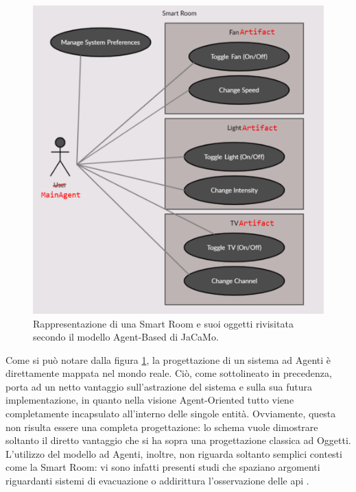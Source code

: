 \documentclass[12pt,a4paper,openright,oneside]{report}
\begin{document}
\begin{figure}[h]
	\centering
	\includegraphics[scale=0.45]{eps/use-case-high-agent.pdf}
	\caption{Rappresentazione di una Smart Room e suoi oggetti rivisitata secondo il modello Agent-Based di JaCaMo.}
	\label{fig:use-case-diagram-high-agent}
\end{figure}

Come si può notare dalla figura \ref{fig:use-case-diagram-high-agent}, la progettazione di un sistema ad Agenti è direttamente mappata nel mondo reale. Ciò, come sottolineato in precedenza, porta ad un netto vantaggio sull'astrazione del sistema e sulla sua futura implementazione, in quanto nella visione Agent-Oriented tutto viene completamente incapsulato all'interno delle singole entità. Ovviamente, questa non risulta essere una completa progettazione: lo schema vuole dimostrare soltanto il diretto vantaggio che si ha sopra una progettazione classica ad Oggetti.\\

L'utilizzo del modello ad Agenti, inoltre, non riguarda soltanto semplici contesti come la Smart Room: vi sono infatti presenti studi che spaziano argomenti riguardanti sistemi di evacuazione \cite{evacuation} o addirittura l'osservazione delle api \cite{bee}.
\end{document}
